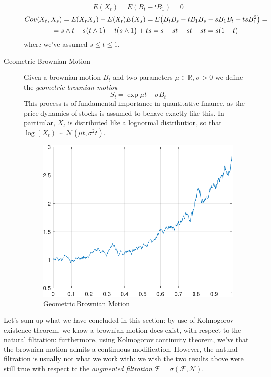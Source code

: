 \begin{description}
    \begin{equation}
        E(X_t) = E(B_t - t B_1) = 0
    \end{equation}
    \begin{gather}
        Cov(X_t, X_s) = E(X_t X_s) - E(X_t) E(X_s) = E\big(B_t B_s - t B_1 B_s - s B_1 B_t + ts B_1^2\big) = \notag \\
        = s \wedge t - s \big(t \wedge 1\big) - t \big( s \wedge 1 \big) + ts = s -st -st + st = s(1-t)
    \end{gather}
    where we've assumed $s \leq t \leq 1$. 
    \item[Geometric Brownian Motion] Given a brownian motion $B_t$ and two parameters $\mu \in \mathbb{R}$, $\sigma > 0$ we define the \textit{geometric brownian motion}
    \begin{equation}
        S_t = \exp{\mu t + \sigma B_t}
    \end{equation}
    This process is of fundamental importance in quantitative finance, as the price dynamics of stocks is assumed to behave exactly like this. In particular, $X_t$ is distributed like a lognormal distribution, so that $\log(X_t) \sim \mathcal{N}(\mu t, \sigma^2 t)$. 

    \begin{figure}
        \centering
        \includegraphics[width=0.5\linewidth]{assets/gbm.pdf}
        \caption{Geometric Brownian Motion}
        \label{fig:gbm}
    \end{figure}
\end{description}

Let's sum up what we have concluded in this section: by use of Kolmogorov existence theorem, we know a brownian motion does exist, with respect to the natural filtration; furthermore, using Kolmogorov continuity theorem, we've that the brownian motion admits a continuous modification. However, the natural filtration is usually not what we work with: we wish the two results above were still true with respect to the \textit{augmented filtration} $\bar{\mathcal{F}} = \sigma(\mathcal{F},\mathcal{N})$. 

